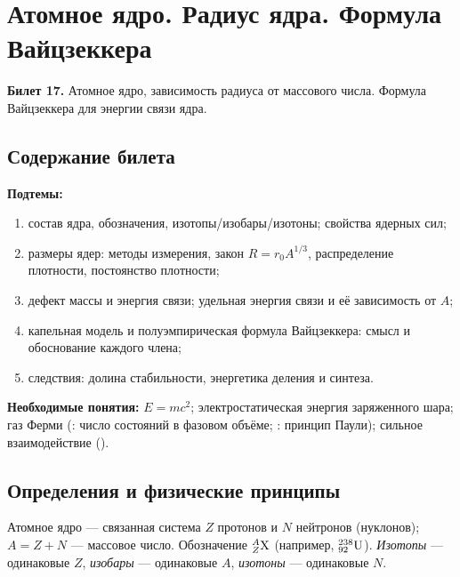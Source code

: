 \chapter[Атомное ядро. Радиус ядра. Формула Вайцзеккера]%
        {Атомное ядро. Радиус ядра. Формула Вайцзеккера}
\label{t:17}

\begin{qbox}
\textbf{Билет 17.} Атомное ядро, зависимость радиуса от массового числа. Формула Вайцзеккера
для энергии связи ядра.
\end{qbox}

\section{Содержание билета}

\textbf{Подтемы:}
\begin{enumerate}
 \item состав ядра, обозначения, изотопы/изобары/изотоны; свойства ядерных сил;
 \item размеры ядер: методы измерения, закон $R=r_0A^{1/3}$, распределение плотности, постоянство плотности;
 \item дефект массы и энергия связи; удельная энергия связи и её зависимость от $A$;
 \item капельная модель и полуэмпирическая формула Вайцзеккера: смысл и обоснование каждого члена;
 \item следствия: долина стабильности, энергетика деления и синтеза.
\end{enumerate}

\textbf{Необходимые понятия:} $E=mc^2$; электростатическая энергия заряженного шара; газ Ферми
(: число состояний в фазовом объёме; : принцип Паули); сильное взаимодействие ().

\section{Определения и физические принципы}

\begin{definition}[ядро]
Атомное ядро — связанная система $Z$ протонов и $N$ нейтронов (нуклонов); $A=Z+N$ — массовое число.
Обозначение $\nuc{X}{A}{Z}$ (например, $\nuc{U}{238}{92}$). \emph{Изотопы} — одинаковые $Z$, \emph{изобары} — одинаковые $A$,
\emph{изотоны} — одинаковые $N$.
\end{definition}

